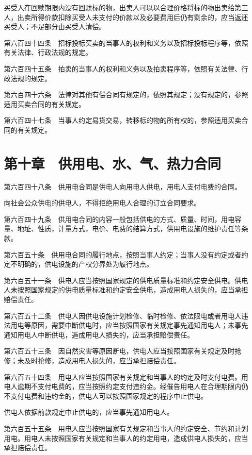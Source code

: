\documentclass[UTF8,12pt,a4paper]{ctexbook}
\begin{document}
买受人在回赎期限内没有回赎标的物，出卖人可以以合理价格将标的物出卖给第三人，出卖所得价款扣除买受人未支付的价款以及必要费用后仍有剩余的，应当返还买受人；不足部分由买受人清偿。

第六百四十四条　招标投标买卖的当事人的权利和义务以及招标投标程序等，依照有关法律、行政法规的规定。

第六百四十五条　拍卖的当事人的权利和义务以及拍卖程序等，依照有关法律、行政法规的规定。

第六百四十六条　法律对其他有偿合同有规定的，依照其规定；没有规定的，参照适用买卖合同的有关规定。

第六百四十七条　当事人约定易货交易，转移标的物的所有权的，参照适用买卖合同的有关规定。

\section*{第十章　供用电、水、气、热力合同}

第六百四十八条　供用电合同是供电人向用电人供电，用电人支付电费的合同。

向社会公众供电的供电人，不得拒绝用电人合理的订立合同要求。

第六百四十九条　供用电合同的内容一般包括供电的方式、质量、时间，用电容量、地址、性质，计量方式，电价、电费的结算方式，供用电设施的维护责任等条款。

第六百五十条　供用电合同的履行地点，按照当事人约定；当事人没有约定或者约定不明确的，供电设施的产权分界处为履行地点。

第六百五十一条　供电人应当按照国家规定的供电质量标准和约定安全供电。供电人未按照国家规定的供电质量标准和约定安全供电，造成用电人损失的，应当承担赔偿责任。

第六百五十二条　供电人因供电设施计划检修、临时检修、依法限电或者用电人违法用电等原因，需要中断供电时，应当按照国家有关规定事先通知用电人；未事先通知用电人中断供电，造成用电人损失的，应当承担赔偿责任。

第六百五十三条　因自然灾害等原因断电，供电人应当按照国家有关规定及时抢修；未及时抢修，造成用电人损失的，应当承担赔偿责任。

第六百五十四条　用电人应当按照国家有关规定和当事人的约定及时支付电费。用电人逾期不支付电费的，应当按照约定支付违约金。经催告用电人在合理期限内仍不支付电费和违约金的，供电人可以按照国家规定的程序中止供电。

供电人依据前款规定中止供电的，应当事先通知用电人。

第六百五十五条　用电人应当按照国家有关规定和当事人的约定安全、节约和计划用电。用电人未按照国家有关规定和当事人的约定用电，造成供电人损失的，应当承担赔偿责任。
\end{document}
